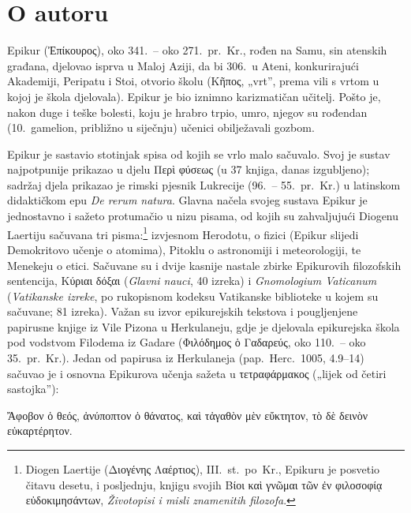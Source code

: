 \section*{O autoru}

Epikur (Ἐπίκουρος), oko 341.\ – oko 271.\ pr.~Kr., rođen na Samu, sin atenskih građana, djelovao isprva u Maloj Aziji, da bi 306.\ u Ateni, konkurirajući Akademiji, Peripatu i Stoi, otvorio školu (Κῆπος, „vrt”, prema vili s vrtom u kojoj je škola djelovala). Epikur je bio iznimno karizmatičan učitelj. Pošto je, nakon duge i teške bolesti, koju je hrabro trpio, umro, njegov su rođendan (10.\ gamelion, približno u siječnju) učenici obilježavali gozbom.

Epikur je sastavio stotinjak spisa od kojih se vrlo malo sačuvalo. Svoj je sustav najpotpunije prikazao u djelu Περὶ φύσεως (u 37 knjiga, danas izgubljeno); sadržaj djela prikazao je rimski pjesnik Lukrecije (96.\ – 55.\ pr.~Kr.) u latinskom didaktičkom epu \textit{De rerum natura}. Glavna načela svojeg sustava Epikur je jednostavno i sažeto protumačio u nizu pisama, od kojih su zahvaljujući Diogenu Laertiju sačuvana tri pisma:\footnote{Diogen Laertije (Διογένης Λαέρτιος), III.\ st.\ po~Kr., Epikuru je posvetio čitavu desetu, i posljednju, knjigu svojih \textgreek{Βίοι καὶ γνῶμαι τῶν ἐν φιλοσοφίᾳ εὐδοκιμησάντων,} \textit{Životopisi i misli znamenitih filozofa}.} izvjesnom Herodotu, o fizici (Epikur slijedi Demokritovo učenje o atomima), Pitoklu o astronomiji i meteorologiji, te Menekeju o etici. Sačuvane su i dvije kasnije nastale zbirke Epikurovih filozofskih sentencija, Κύριαι δόξαι (\textit{Glavni nauci}, 40 izreka) i \textit{Gnomologium Vaticanum} (\textit{Vatikanske izreke}, po rukopisnom kodeksu Vatikanske biblioteke u kojem su sačuvane; 81 izreka). Važan su izvor epikurejskih tekstova i pougljenjene papirusne knjige iz Vile Pizona u Herkulaneju, gdje je djelovala epikurejska škola pod vodstvom Filodema iz Gadare (Φιλόδημος ὁ Γαδαρεύς, oko 110.\ – oko 35.\ pr.~Kr.). Jedan od papirusa iz Herkulaneja (pap.\ Herc.\ 1005, 4.9–14) sačuvao je i osnovna Epikurova učenja sažeta u τετραφάρμακος („lijek od četiri sastojka”): \begin{greek}Ἄφοβον ὁ θεός, ἀνύποπτον ὁ θάνατος, καὶ τἀγαθὸν μὲν εὔκτητον, τὸ δὲ δεινὸν εὐκαρτέρητον.\end{greek}

